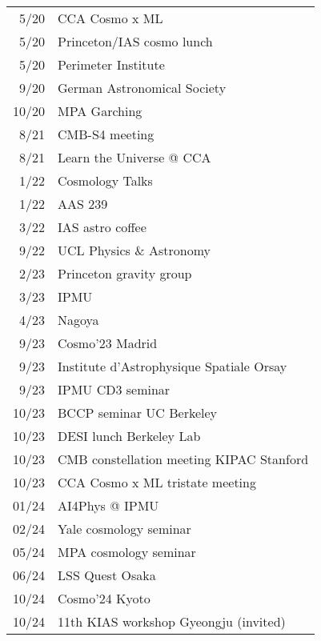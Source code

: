 \begin{tabular}{r l}
 5/20 & CCA Cosmo x ML \\
 5/20 & Princeton/IAS cosmo lunch \\
 5/20 & Perimeter Institute \\
 9/20 & German Astronomical Society \\
10/20 & MPA Garching \\
 8/21 & CMB-S4 meeting \\
 8/21 & Learn the Universe @ CCA \\
 1/22 & Cosmology Talks \\
 1/22 & AAS 239 \\
 3/22 & IAS astro coffee \\
 9/22 & UCL Physics \& Astronomy \\
 2/23 & Princeton gravity group \\
 3/23 & IPMU \\
 4/23 & Nagoya \\
 9/23 & Cosmo'23 Madrid \\
 9/23 & Institute d'Astrophysique Spatiale Orsay \\
 9/23 & IPMU CD3 seminar \\
10/23 & BCCP seminar UC Berkeley \\
10/23 & DESI lunch Berkeley Lab \\
10/23 & CMB constellation meeting KIPAC Stanford \\
10/23 & CCA Cosmo x ML tristate meeting \\
01/24 & AI4Phys @ IPMU \\
02/24 & Yale cosmology seminar \\
05/24 & MPA cosmology seminar \\
06/24 & LSS Quest Osaka \\
10/24 & Cosmo'24 Kyoto \\
10/24 & 11th KIAS workshop Gyeongju (invited)
\end{tabular}
